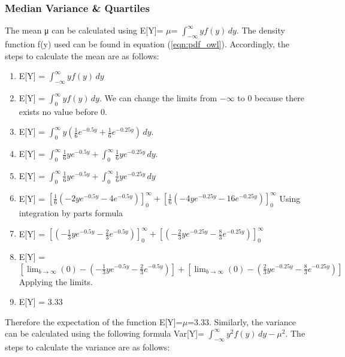 \subsubsection{Median Variance \& Quartiles}    

The mean μ can be calculated using E[Y]= $\mu$= $\int_{-\infty}^{\infty} yf(y)\,dy$. The density function f(y) used can be found in equation (\ref{eqn:pdf_owl}). Accordingly, the steps to calculate the mean are as follows: 

\begin{enumerate}
    \item E[Y] = $\int_{-\infty}^{\infty} yf(y)\,dy$
    \item E[Y] = $\int_{0}^{\infty} yf(y)\,dy$.  We can change the limits from $-\infty$ to 0 because there exists no value before 0.
    \item E[Y] = $\int_{0}^{\infty} y(\frac{1}{6}e^{-0.5y} + \frac{1}{6}e^{-0.25y})\,dy$.
    \item E[Y] = $\int_{0}^{\infty} \frac{1}{6}ye^{-0.5y} + \int_{0}^{\infty} \frac{1}{6}ye^{-0.25y}\,dy$.
    \item E[Y] = $\int_{0}^{\infty} \frac{1}{6}ye^{-0.5y} + \int_{0}^{\infty} \frac{1}{6}ye^{-0.25y}\,dy$ \label{eqn:mean_line_5}
    \item E[Y] = $[\frac{1}{6}(-2ye^{-0.5y}-4e^{-0.5y})]_0^\infty + [\frac{1}{6}(-4ye^{-0.25y}-16e^{-0.25y})]_0^\infty$ Using integration by parts formula
    \item E[Y] = $[(-\frac{1}{3}ye^{-0.5y}-\frac{2}{3}e^{-0.5y})]_0^\infty + [(-\frac{2}{3}ye^{-0.25y}-\frac{8}{3}e^{-0.25y})]_0^\infty$
    \item E[Y] = $[\lim_{b\to\infty}(0)-(-\frac{1}{3}ye^{-0.5y}-\frac{2}{3}e^{-0.5y})] + [\lim_{b\to\infty}(0)-(\frac{2}{3}ye^{-0.25y}-\frac{8}{3}e^{-0.25y})]$ Applying the limits.
    \item E[Y] = 3.33
\end{enumerate}
Therefore the expectation of the function E[Y]=$\mu$=3.33. Similarly, the variance can be calculated using the following formula Var[Y]= $\int_{-\infty}^{\infty}y^2f(y)\,dy - \mu^2$. The steps to calculate the variance are as follows: 


